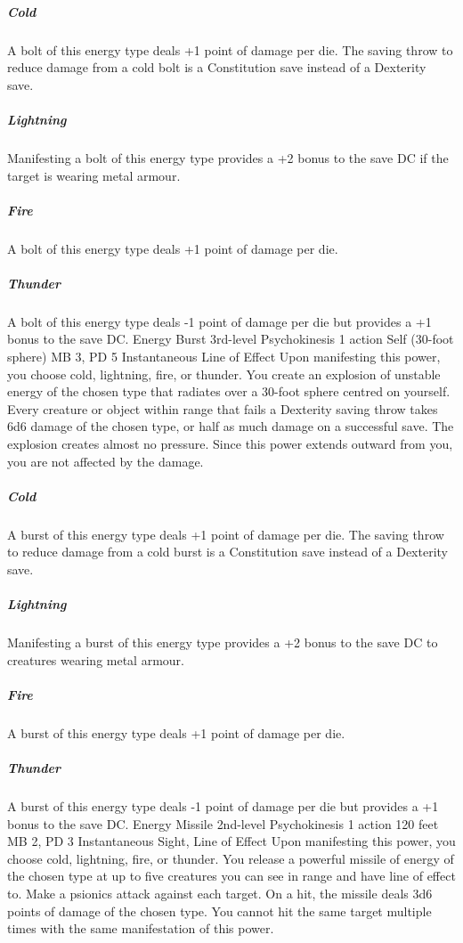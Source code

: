 \subparagraph{Cold} A bolt of this energy type deals +1 point
of damage per die. The saving throw to reduce damage from
a cold bolt is a Constitution save instead of a Dexterity
save.

\subparagraph{Lightning} Manifesting a bolt of this energy
type provides a +2 bonus to the save DC if the target is wearing
metal armour.

\subparagraph{Fire} A bolt of this energy type deals +1 point
of damage per die.

\subparagraph{Thunder} A bolt of this energy type deals -1 point
of damage per die but provides a +1 bonus to the save DC.
\DndPowerHeader%
    {Energy Burst\label{pwr:energy_burst}}
    {3rd-level Psychokinesis}
    {1 action}
    {Self (30-foot sphere)}
    {MB 3, PD 5}
    {Instantaneous}
    {Line of Effect}
Upon manifesting this power, you choose cold,
lightning, fire, or thunder. You create an explosion of unstable
energy of the chosen type that radiates over a 30-foot sphere
centred on yourself. Every creature or object within range
that fails a Dexterity saving throw takes 6d6 damage of the
chosen type, or half as much damage on a successful save.
The explosion creates almost no pressure. Since this power
extends outward from you, you are not affected by the damage.

\subparagraph{Cold} A burst of this energy type deals +1 point
of damage per die. The saving throw to reduce damage from
a cold burst is a Constitution save instead of a Dexterity
save.

\subparagraph{Lightning} Manifesting a burst of this energy
type provides a +2 bonus to the save DC to creatures wearing
metal armour.

\subparagraph{Fire} A burst of this energy type deals +1 point
of damage per die.

\subparagraph{Thunder} A burst of this energy type deals -1
point of damage per die but provides a +1 bonus to the save
DC.
\DndPowerHeader%
    {Energy Missile\label{pwr:energy_missile}}
    {2nd-level Psychokinesis}
    {1 action}
    {120 feet}
    {MB 2, PD 3}
    {Instantaneous}
    {Sight, Line of Effect}
Upon manifesting this power, you choose cold,
lightning, fire, or thunder. You release a powerful missile
of energy of the chosen type at up to five creatures you can
see in range and have line of effect to. Make a psionics attack
against each target. On a hit, the missile deals 3d6 points
of damage of the chosen type. You cannot hit the same target
multiple times with the same manifestation of this power.

